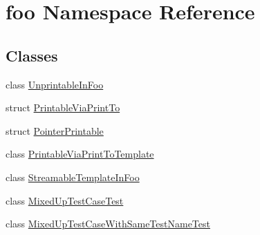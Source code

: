\hypertarget{namespacefoo}{\section{foo Namespace Reference}
\label{namespacefoo}
}
\subsection*{Classes}
\begin{DoxyCompactItemize}
\item 
class \hyperlink{classfoo_1_1_unprintable_in_foo}{Unprintable\-In\-Foo}
\item 
struct \hyperlink{structfoo_1_1_printable_via_print_to}{Printable\-Via\-Print\-To}
\item 
struct \hyperlink{structfoo_1_1_pointer_printable}{Pointer\-Printable}
\item 
class \hyperlink{classfoo_1_1_printable_via_print_to_template}{Printable\-Via\-Print\-To\-Template}
\item 
class \hyperlink{classfoo_1_1_streamable_template_in_foo}{Streamable\-Template\-In\-Foo}
\item 
class \hyperlink{classfoo_1_1_mixed_up_test_case_test}{Mixed\-Up\-Test\-Case\-Test}
\item 
class \hyperlink{classfoo_1_1_mixed_up_test_case_with_same_test_name_test}{Mixed\-Up\-Test\-Case\-With\-Same\-Test\-Name\-Test}
\end{DoxyCompactItemize}
